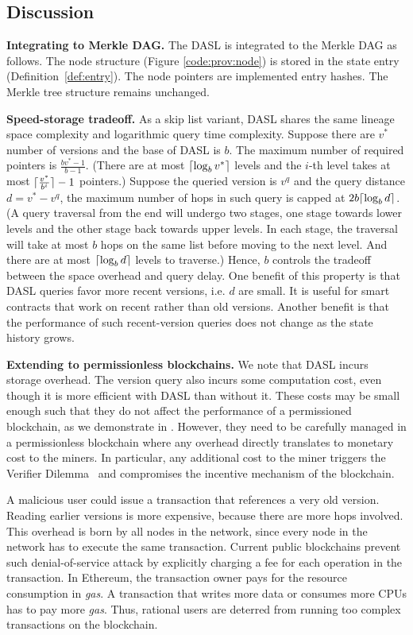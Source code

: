 \subsection{Discussion} \label{prov:sec:model_discuss}
\textbf{Integrating to Merkle DAG. } 
The DASL is integrated to the Merkle DAG as follows. The node structure (Figure \ref{code:prov:node}) is stored in
the state entry (Definition~\ref{def:entry}).  The node pointers are implemented entry hashes. The Merkle tree
structure remains unchanged.  

\textbf{Speed-storage tradeoff. } 
As a skip list variant, DASL shares the same lineage space complexity and 
logarithmic query time complexity. 
Suppose there are $v^*$ number of versions and the base of DASL is $b$. 
The maximum number of required pointers is $\frac{bv^*-1}{b-1}$. 
(There are at most $\lceil\log_b v^*\rceil$ levels and the $i$-th level takes at most $\lceil\frac{v^*}{b^i}\rceil-1$ pointers.)
Suppose the queried version is $v^q$ and the query distance $d=v^*-v^q$, the maximum number of hops in such query is capped at $2b\lceil\log_b d\rceil$. (A query traversal from the end will undergo two stages, one stage towards lower levels  and the other stage back towards upper levels. In each stage, 
the traversal will take at most $b$ hops on the same list before moving to the next level.
And there are at most $\lceil\log_b d\rceil$ levels to traverse.)
Hence, $b$ controls the tradeoff between the space overhead and query delay. 
One benefit of this property is that DASL queries favor more recent
versions, i.e. $d$ are small.
It is useful for smart contracts that work on recent rather than old versions.  
Another benefit is that the performance of such recent-version queries does not change as the state history grows.  

\textbf{Extending to permissionless blockchains. } 
We note that DASL incurs storage overhead. The version query also incurs some computation cost, even though it
is more efficient with DASL than without it. These costs may be small enough such that they do not
affect the performance of a permissioned blockchain, as we demonstrate in .  However,
they need to be carefully managed in a permissionless blockchain where any overhead directly translates to
monetary cost to the miners. In particular, any additional cost to the miner triggers the Verifier
Dilemma~\cite{luu2015demystifying} and compromises the incentive mechanism of the blockchain.  

A malicious user could issue a transaction that references a very old version. Reading earlier versions is more
expensive, because there are more hops involved. This overhead is born by all nodes in the network,
since every node in the network has to execute the same transaction. Current public blockchains prevent such
denial-of-service attack by explicitly charging a fee for each operation in the transaction. In Ethereum, the
transaction owner pays for the resource consumption in {\em gas}. A transaction that writes more data or
consumes more CPUs has to pay more {\em gas}. Thus, rational users are deterred from running too complex
transactions on the blockchain. 

